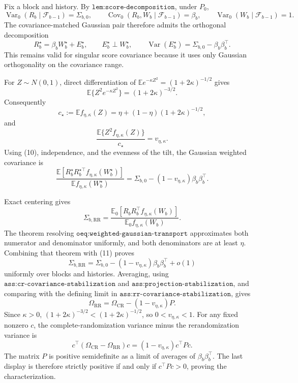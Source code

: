 Fix a block and history.  By \(\texttt{lem:score-decomposition}\), under \(P_0\),
\[
 \operatorname{Var}_0(R_b\mid\mathcal F_{b-1})=\Sigma_{b,0},
 \qquad \operatorname{Cov}_0(R_b,W_b\mid\mathcal F_{b-1})=\beta_b,
 \qquad \operatorname{Var}_0(W_b\mid\mathcal F_{b-1})=1.
\]
The covariance-matched Gaussian pair therefore admits the orthogonal decomposition
\[
 R_b^\star=\beta_bW_b^\star+E_b^\star,
 \qquad E_b^\star\perp W_b^\star,
 \qquad \operatorname{Var}(E_b^\star)=\Sigma_{b,0}-\beta_b\beta_b^\top.     \tag{10}
\]
This remains valid for singular score covariance because it uses only Gaussian orthogonality on the covariance range.

For \(Z\sim N(0,1)\), direct differentiation of
\(\mathbb Ee^{-\kappa Z^2}=(1+2\kappa)^{-1/2}\) gives
\[
 \mathbb E\{Z^2e^{-\kappa Z^2}\}=(1+2\kappa)^{-3/2}.
\]
Consequently
\[
 c_\star:=\mathbb Ef_{\eta,\kappa}(Z)
 =\eta+(1-\eta)(1+2\kappa)^{-1/2},
\]
and
\[
 \frac{\mathbb E\{Z^2f_{\eta,\kappa}(Z)\}}{c_\star}
 =v_{\eta,\kappa}.
\]
Using (10), independence, and the evenness of the tilt, the Gaussian weighted covariance is
\[
 \frac{\mathbb E[R_b^\star R_b^{\star\top}f_{\eta,\kappa}(W_b^\star)]}
      {\mathbb Ef_{\eta,\kappa}(W_b^\star)}
 =\Sigma_{b,0}-(1-v_{\eta,\kappa})\beta_b\beta_b^\top.          \tag{11}
\]

Exact centering gives
\[
 \Sigma_{b,\mathrm{RR}}
 =\frac{\mathbb E_0[R_bR_b^\top f_{\eta,\kappa}(W_b)]}
        {\mathbb E_0 f_{\eta,\kappa}(W_b)}.
\]
The theorem resolving \(\texttt{oeq:weighted-gaussian-transport}\) approximates both numerator and denominator uniformly, and both denominators are at least \(\eta\).  Combining that theorem with (11) proves
\[
 \Sigma_{b,\mathrm{RR}}
 =\Sigma_{b,0}-(1-v_{\eta,\kappa})\beta_b\beta_b^\top+o(1)
\]
uniformly over blocks and histories.  Averaging, using \(\texttt{ass:cr-covariance-stabilization}\) and \(\texttt{ass:projection-stabilization}\), and comparing with the defining limit in \(\texttt{ass:rr-covariance-stabilization}\), gives
\[
 \Omega_{\mathrm{RR}}
 =\Omega_{\mathrm{CR}}-(1-v_{\eta,\kappa})P.
\]
Since \(\kappa>0\), \((1+2\kappa)^{-3/2}<(1+2\kappa)^{-1/2}\), so \(0<v_{\eta,\kappa}<1\).  For any fixed nonzero \(c\), the complete-randomization variance minus the rerandomization variance is
\[
 c^\top(\Omega_{\mathrm{CR}}-\Omega_{\mathrm{RR}})c
 =(1-v_{\eta,\kappa})c^\top Pc.
\]
The matrix \(P\) is positive semidefinite as a limit of averages of \(\beta_b\beta_b^\top\).  The last display is therefore strictly positive if and only if \(c^\top Pc>0\), proving the characterization.